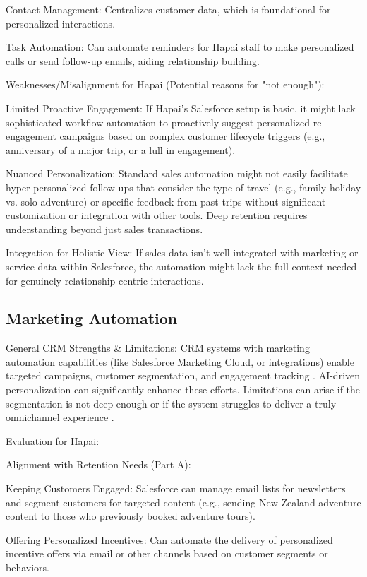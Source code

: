 \documentclass{article}
\begin{document}
Contact Management: Centralizes customer data, which is foundational for personalized interactions.

Task Automation: Can automate reminders for Hapai staff to make personalized calls or send follow-up emails, aiding relationship building.

Weaknesses/Misalignment for Hapai (Potential reasons for "not enough"):

Limited Proactive Engagement: If Hapai's Salesforce setup is basic, it might lack sophisticated workflow automation to proactively suggest personalized re-engagement campaigns based on complex customer lifecycle triggers (e.g., anniversary of a major trip, or a lull in engagement).

Nuanced Personalization: Standard sales automation might not easily facilitate hyper-personalized follow-ups that consider the type of travel (e.g., family holiday vs. solo adventure) or specific feedback from past trips without significant customization or integration with other tools. Deep retention requires understanding beyond just sales transactions.

Integration for Holistic View: If sales data isn't well-integrated with marketing or service data within Salesforce, the automation might lack the full context needed for genuinely relationship-centric interactions.

\subsection{Marketing Automation}

General CRM Strengths \& Limitations:
CRM systems with marketing automation capabilities (like Salesforce Marketing Cloud, or integrations) enable targeted campaigns, customer segmentation, and engagement tracking \cite{jacob_customer_nodate}. AI-driven personalization can significantly enhance these efforts. Limitations can arise if the segmentation is not deep enough or if the system struggles to deliver a truly omnichannel experience \cite{ledro_artificial_2022}.

Evaluation for Hapai:

Alignment with Retention Needs (Part A):

Keeping Customers Engaged: Salesforce can manage email lists for newsletters and segment customers for targeted content (e.g., sending New Zealand adventure content to those who previously booked adventure tours).

Offering Personalized Incentives: Can automate the delivery of personalized incentive offers via email or other channels based on customer segments or behaviors.
\end{document}
